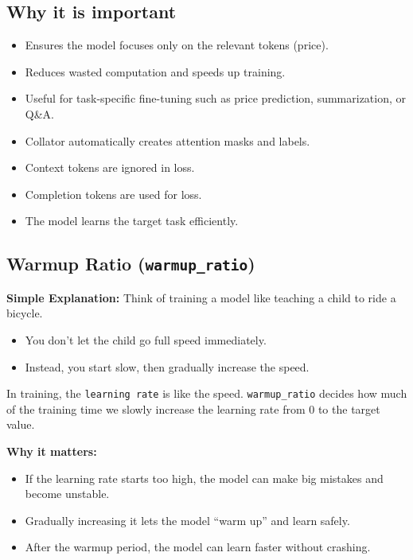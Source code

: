 \subsection{Why it is important}
\begin{itemize}
    \item Ensures the model focuses only on the relevant tokens (price).
    \item Reduces wasted computation and speeds up training.
    \item Useful for task-specific fine-tuning such as price prediction, summarization, or Q\&A.
\end{itemize}

\begin{tcolorbox}[colback=green!5!white,colframe=green!75!black,title=Summary]
\begin{itemize}
    \item Collator automatically creates attention masks and labels.
    \item Context tokens are ignored in loss.
    \item Completion tokens are used for loss.
    \item The model learns the target task efficiently.
\end{itemize}
\end{tcolorbox}

\noindent\hrulefill
\subsection{Warmup Ratio (\texttt{warmup\_ratio})}

\textbf{Simple Explanation:}  
Think of training a model like teaching a child to ride a bicycle.  
\begin{itemize}
    \item You don’t let the child go full speed immediately.  
    \item Instead, you start slow, then gradually increase the speed.  
\end{itemize}

In training, the \texttt{learning rate} is like the speed.  
\texttt{warmup\_ratio} decides how much of the training time we slowly increase the learning rate from 0 to the target value.

\textbf{Why it matters:}  
\begin{itemize}
    \item If the learning rate starts too high, the model can make big mistakes and become unstable.  
    \item Gradually increasing it lets the model “warm up” and learn safely.  
    \item After the warmup period, the model can learn faster without crashing.  
\end{itemize}

